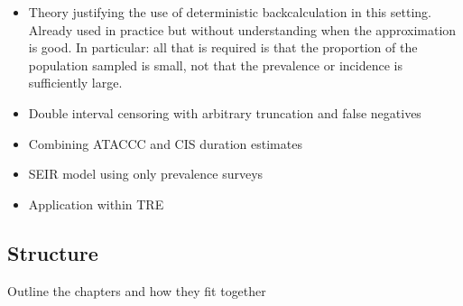 \documentclass[thesis.tex]{subfiles}
\begin{document}
\begin{itemize}
    \item Theory justifying the use of deterministic backcalculation in this setting. Already used in practice but without understanding when the approximation is good. In particular: all that is required is that the proportion of the population sampled is small, not that the prevalence or incidence is sufficiently large.
    \item Double interval censoring with arbitrary truncation and false negatives
    \item Combining ATACCC and CIS duration estimates
    \item SEIR model using only prevalence surveys
    \item Application within TRE
\end{itemize}

\subsection{Structure}

Outline the chapters and how they fit together
\end{document}
